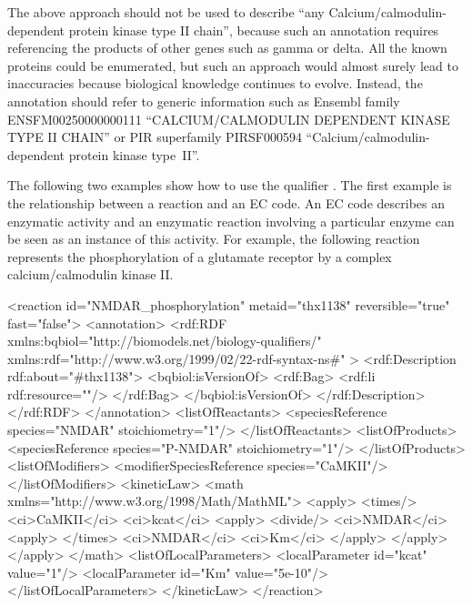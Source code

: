 The above approach should not be used to describe ``any
Calcium/calmodulin-dependent protein kinase type II chain'',
because such an annotation requires referencing the products of
other genes such as gamma or delta. All the known proteins could
be enumerated, but such an approach would almost surely lead to
inaccuracies because biological knowledge continues to evolve.
Instead, the annotation should refer to generic information such
as Ensembl family ENSFM00250000000111 ``CALCIUM/CALMODULIN DEPENDENT
KINASE TYPE II CHAIN'' or PIR superfamily PIRSF000594
``Calcium/calmodulin-dependent protein kinase type~II''.


The following two examples show how to use the qualifier
. The first example is the relationship
between a reaction and an EC code. An EC code describes an
enzymatic activity and an enzymatic reaction involving a
particular enzyme can be seen as an instance of this activity. For
example, the following reaction represents the phosphorylation of
a glutamate receptor by a complex calcium/calmodulin kinase II.

\begin{example}
<reaction id="NMDAR_phosphorylation" metaid="thx1138"
          reversible="true" fast="false">
  <annotation>
    <rdf:RDF
      xmlns:bqbiol="http://biomodels.net/biology-qualifiers/"
      xmlns:rdf="http://www.w3.org/1999/02/22-rdf-syntax-ns\#"
    >
      <rdf:Description rdf:about="#thx1138">
        <bqbiol:isVersionOf>
          <rdf:Bag>
            <rdf:li rdf:resource="\!"/>
          </rdf:Bag>
        </bqbiol:isVersionOf>
      </rdf:Description>
    </rdf:RDF>
  </annotation>
  <listOfReactants>
    <speciesReference species="NMDAR" stoichiometry="1"/>
  </listOfReactants>
  <listOfProducts>
    <speciesReference species="P-NMDAR" stoichiometry="1"/>
  </listOfProducts>
  <listOfModifiers>
    <modifierSpeciesReference species="CaMKII"/>
  </listOfModifiers>
  <kineticLaw>
    <math xmlns="http://www.w3.org/1998/Math/MathML">
      <apply>
        <times/>
        <ci>CaMKII</ci>
        <ci>kcat</ci>
        <apply>
          <divide/>
          <ci>NMDAR</ci>
          <apply> </times> <ci>NMDAR</ci> <ci>Km</ci> </apply>
        </apply>
      </apply>
    </math>
    <listOfLocalParameters>
      <localParameter id="kcat" value="1"/>
      <localParameter id="Km" value="5e-10"/>
    </listOfLocalParameters>
  </kineticLaw>
</reaction>
\end{example}

